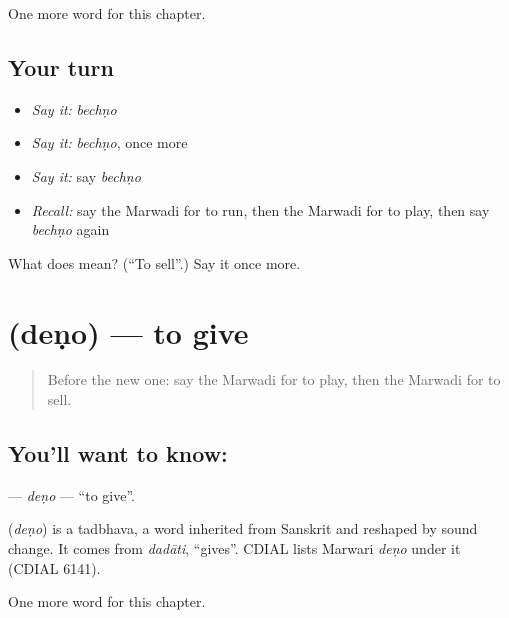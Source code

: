 \begin{grammarlens}[title={What you've built}]
One more word for this chapter.
\end{grammarlens}

\subsection*{Your turn}
\begin{itemize}
\raggedright
  \item \emph{Say it:} \emph{bechṇo}
  \item \emph{Say it:} \emph{bechṇo}, once more
  \item \emph{Say it:} say \emph{bechṇo}
  \item \emph{Recall:} say the Marwadi for to run, then the Marwadi for to play, then say \emph{bechṇo} again
\end{itemize}

\begin{tcolorbox}[breakable,colback=teal!4,colframe=teal!35!black,title={Before you move on}]
What does  mean? (\textquotedblleft{}To sell\textquotedblright{}.) Say it once more.
\end{tcolorbox}
\section[\texorpdfstring{\mw{देणो} (deṇo)}{देणो (deṇo)}]{ (deṇo) — to give}

\label{lesson:MW-C53-deno}



\begin{quote}
Before the new one: say the Marwadi for to play, then the Marwadi for to sell.
\end{quote}

\subsection*{You'll want to know: }
\textbf{} — \emph{deṇo} — \textquotedblleft{}to give\textquotedblright{}.

\begin{cousinweb}
\textbf{} (\emph{deṇo}) is a tadbhava, a word inherited from Sanskrit and reshaped by sound change. It comes from \emph{dadāti}, \textquotedblleft{}gives\textquotedblright{}. CDIAL lists Marwari \emph{deṇo} under it (CDIAL 6141).
\end{cousinweb}

\begin{grammarlens}[title={What you've built}]
One more word for this chapter.
\end{grammarlens}

